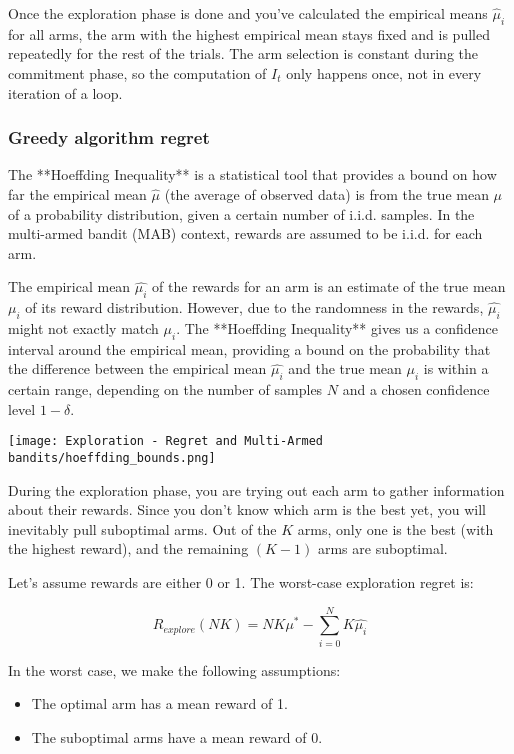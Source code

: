 Once the exploration phase is done and you've calculated the empirical means $\hat{\mu}_i$ for all arms, the arm with the highest empirical mean stays fixed and is pulled repeatedly for the rest of the trials. The arm selection is constant during the commitment phase, so the computation of $I_t$ only happens once, not in every iteration of a loop.

\subsubsection{Greedy algorithm regret}


The **Hoeffding Inequality** is a statistical tool that provides a bound on how far the empirical mean $\hat{\mu}$ (the average of observed data) is from the true mean $\mu$ of a probability distribution, given a certain number of i.i.d. samples. In the multi-armed bandit (MAB) context, rewards are assumed to be i.i.d. for each arm.

The empirical mean $\hat{\mu_i}$ of the rewards for an arm is an estimate of the true mean $\mu_i$ of its reward distribution. However, due to the randomness in the rewards, $\hat{\mu_i}$ might not exactly match $\mu_i$. The **Hoeffding Inequality** gives us a confidence interval around the empirical mean, providing a bound on the probability that the difference between the empirical mean $\hat{\mu_i}$ and the true mean $\mu_i$ is within a certain range, depending on the number of samples $N$ and a chosen confidence level $1 - \delta$.

\begin{center}
    \texttt{[image: Exploration - Regret and Multi-Armed bandits/hoeffding\_bounds.png]}
\end{center}


During the exploration phase, you are trying out each arm to gather information about their rewards. Since you don't know which arm is the best yet, you will inevitably pull suboptimal arms. Out of the $K$ arms, only one is the best (with the highest reward), and the remaining $(K-1)$ arms are suboptimal.

Let’s assume rewards are either 0 or 1. The worst-case exploration regret is:

$$
    R_{explore}(NK) = NK\mu^* - \sum_{i=0}^NK \hat{\mu_i}
$$

In the worst case, we make the following assumptions:
\begin{itemize}
    \item The optimal arm has a mean reward of 1.
    \item The suboptimal arms have a mean reward of 0.
\end{itemize}

